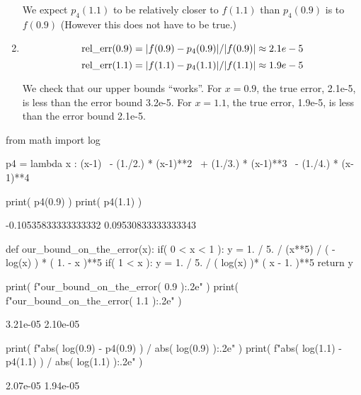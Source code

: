 \documentclass[pdftex,11pt]{article}
\begin{document}
\begin{enumerate}
                    We expect $p_4(1.1)$ to be relatively closer to $f(1.1)$ than $p_4(0.9)$ is to $f(0.9)$
			(However this does not have to be true.)


\item



                    \[ \textmd{rel\_err}(0.9) = | f(0.9) -  p_4(0.9) |/|f(0.9)| \approx 2.1e-5 \]
                    \[ \textmd{rel\_err}(1.1) = | f(1.1) -  p_4(1.1) |/|f(1.1)| \approx 1.9e-5 \]

We check that our upper bounds ``works''. For $x=0.9$, the true error, 2.1e-5, is less than the error bound 3.2e-5.
For $x=1.1$, the true error, 1.9e-5, is less than the error bound 2.1e-5.





            \end{enumerate}



\begin{python}
from math import log
\end{python}
\begin{python}
p4 = lambda x : (x-1) \
              - (1./2.) * (x-1)**2 \
              + (1./3.) * (x-1)**3 \
              - (1./4.) * (x-1)**4
\end{python}
\begin{python}
print( p4(0.9) )
print( p4(1.1) )
\end{python}
\begin{pythonoutput}
-0.10535833333333332
0.09530833333333343
\end{pythonoutput}
\begin{python}
def our_bound_on_the_error(x):
  if(  0 < x < 1 ): y = 1. / 5. / (x**5) / ( - log(x) ) * ( 1. - x )**5
  if(  1 < x ): y = 1. / 5. / ( log(x) )* ( x - 1. )**5
  return y

print( f"{our_bound_on_the_error( 0.9 ):.2e}" )
print( f"{our_bound_on_the_error( 1.1 ):.2e}" )
\end{python}
\begin{pythonoutput}
3.21e-05
2.10e-05
\end{pythonoutput}
\begin{python}
print( f"{abs( log(0.9) - p4(0.9) ) / abs( log(0.9) ):.2e}" )
print( f"{abs( log(1.1) - p4(1.1) ) / abs( log(1.1) ):.2e}" )
\end{python}
\begin{pythonoutput}
2.07e-05
1.94e-05
\end{pythonoutput}
\end{document}
